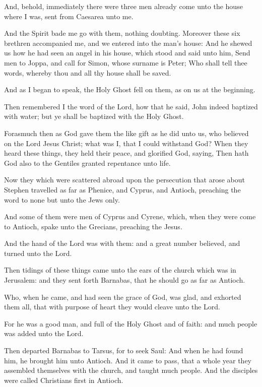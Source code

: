 \verse And, behold, immediately there were three men already come unto the house where I was, sent from Caesarea unto me.

\verse And the Spirit bade me go with them, nothing doubting. Moreover these six brethren accompanied me, and we entered into the man's house: \verse And he shewed us how he had seen an angel in his house, which stood and said unto him, Send men to Joppa, and call for Simon, whose surname is Peter; \verse Who shall tell thee words, whereby thou and all thy house shall be saved.

\verse And as I began to speak, the Holy Ghost fell on them, as on us at the beginning.

\verse Then remembered I the word of the Lord, how that he said, John indeed baptized with water; but ye shall be baptized with the Holy Ghost.

\verse Forasmuch then as God gave them the like gift as he did unto us, who believed on the Lord Jesus Christ; what was I, that I could withstand God?  \verse When they heard these things, they held their peace, and glorified God, saying, Then hath God also to the Gentiles granted repentance unto life.

\verse Now they which were scattered abroad upon the persecution that arose about Stephen travelled as far as Phenice, and Cyprus, and Antioch, preaching the word to none but unto the Jews only.

\verse And some of them were men of Cyprus and Cyrene, which, when they were come to Antioch, spake unto the Grecians, preaching the \LORD Jesus.

\verse And the hand of the Lord was with them: and a great number believed, and turned unto the Lord.

\verse Then tidings of these things came unto the ears of the church which was in Jerusalem: and they sent forth Barnabas, that he should go as far as Antioch.

\verse Who, when he came, and had seen the grace of God, was glad, and exhorted them all, that with purpose of heart they would cleave unto the Lord.

\verse For he was a good man, and full of the Holy Ghost and of faith: and much people was added unto the Lord.

\verse Then departed Barnabas to Tarsus, for to seek Saul: \verse And when he had found him, he brought him unto Antioch. And it came to pass, that a whole year they assembled themselves with the church, and taught much people. And the disciples were called Christians first in Antioch.

